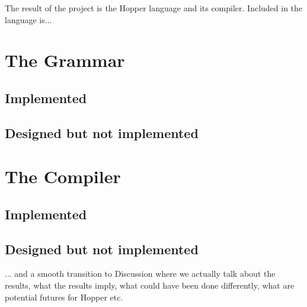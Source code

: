 

The result of the project is the Hopper language and its compiler. Included in the language is...

\section{The Grammar}

\subsection{Implemented}
\subsection{Designed but not implemented}
\section{The Compiler}

\subsection{Implemented}

\subsection{Designed but not implemented}






... and a smooth transition to Discussion where we actually talk about the results, what the results imply, what could have been done differently, what are potential futures for Hopper etc.